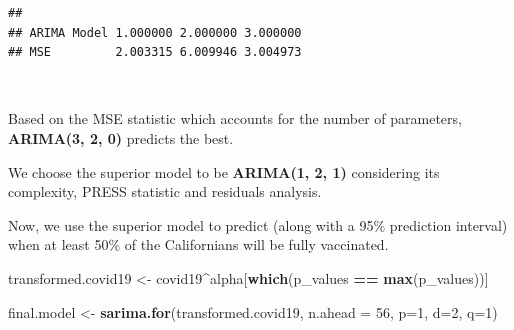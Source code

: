 \documentclass[]{article}
\newenvironment{Shaded}{\begin{snugshade}}{\end{snugshade}}
\newcommand{\DataTypeTok}[1]{\textcolor[rgb]{0.13,0.29,0.53}{#1}}
\newcommand{\DecValTok}[1]{\textcolor[rgb]{0.00,0.00,0.81}{#1}}
\newcommand{\FloatTok}[1]{\textcolor[rgb]{0.00,0.00,0.81}{#1}}
\newcommand{\KeywordTok}[1]{\textcolor[rgb]{0.13,0.29,0.53}{\textbf{#1}}}
\newcommand{\NormalTok}[1]{#1}
\newcommand{\OperatorTok}[1]{\textcolor[rgb]{0.81,0.36,0.00}{\textbf{#1}}}
\newcommand{\StringTok}[1]{\textcolor[rgb]{0.31,0.60,0.02}{#1}}
\begin{document}
\begin{Shaded}
\end{Shaded}

\begin{verbatim}
##                                       
## ARIMA Model 1.000000 2.000000 3.000000
## MSE         2.003315 6.009946 3.004973
\end{verbatim}

\(\;\)

Based on the MSE statistic which accounts for the number of parameters,
\textbf{ARIMA(3, 2, 0)} predicts the best.

We choose the superior model to be \textbf{ARIMA(1, 2, 1)} considering
its complexity, PRESS statistic and residuals analysis.

Now, we use the superior model to predict (along with a 95\% prediction
interval) when at least 50\% of the Californians will be fully
vaccinated.

\begin{Shaded}
\begin{Highlighting}[]
\NormalTok{transformed.covid19 <-}\StringTok{ }\NormalTok{covid19}\OperatorTok{^}\NormalTok{alpha[}\KeywordTok{which}\NormalTok{(p_values }\OperatorTok{==}\StringTok{ }\KeywordTok{max}\NormalTok{(p_values))]}

\NormalTok{final.model <-}\StringTok{ }\KeywordTok{sarima.for}\NormalTok{(transformed.covid19, }\DataTypeTok{n.ahead =} \DecValTok{56}\NormalTok{, }\DataTypeTok{p=}\DecValTok{1}\NormalTok{, }\DataTypeTok{d=}\DecValTok{2}\NormalTok{, }\DataTypeTok{q=}\DecValTok{1}\NormalTok{)}
\end{Highlighting}
\end{Shaded}
\end{document}
